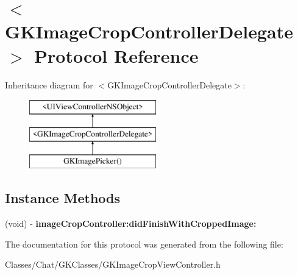 \hypertarget{protocol_g_k_image_crop_controller_delegate-p}{}\section{$<$G\+K\+Image\+Crop\+Controller\+Delegate$>$ Protocol Reference}
\label{protocol_g_k_image_crop_controller_delegate-p}
Inheritance diagram for $<$G\+K\+Image\+Crop\+Controller\+Delegate$>$\+:\begin{figure}[H]
\begin{center}
\leavevmode
\includegraphics[height=3.000000cm]{protocol_g_k_image_crop_controller_delegate-p}
\end{center}
\end{figure}
\subsection*{Instance Methods}
\begin{DoxyCompactItemize}
\item 
\hypertarget{protocol_g_k_image_crop_controller_delegate-p_abd66cf2308ee234fba1f90f335990a1e}{}(void) -\/ {\bfseries image\+Crop\+Controller\+:did\+Finish\+With\+Cropped\+Image\+:}\label{protocol_g_k_image_crop_controller_delegate-p_abd66cf2308ee234fba1f90f335990a1e}

\end{DoxyCompactItemize}


The documentation for this protocol was generated from the following file\+:\begin{DoxyCompactItemize}
\item 
Classes/\+Chat/\+G\+K\+Classes/G\+K\+Image\+Crop\+View\+Controller.\+h\end{DoxyCompactItemize}
